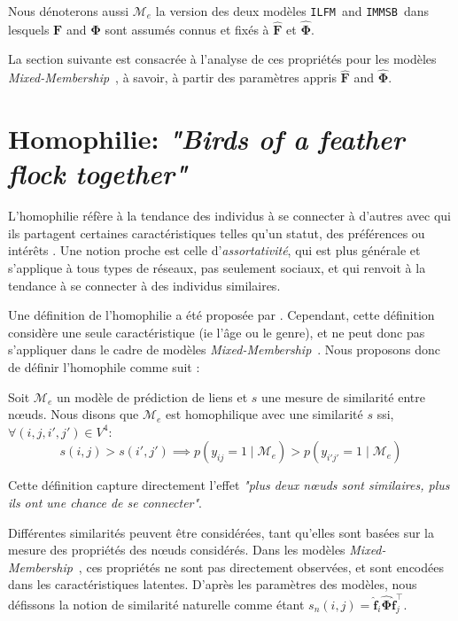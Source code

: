 \documentclass[french]{hermes-journal}
\newcommand{\ilfm}{\texttt{ILFM}}
\newcommand{\immsb}{\texttt{IMMSB}}
\newcommand{\mmm}{\textit{Mixed-Membership}~}
\newcommand{\pr}{p}
\newcommand{\mat}[1]{\bm{#1}}
\begin{document}
Nous dénoterons aussi $\mathcal{M}_e$ la version des deux modèles \ilfm\ and \immsb\ dans lesquels $\mat{F}$ and $\mat{\Phi}$ sont assumés connus et fixés à $\mat{\hat{F}}$ et  $\mat{\hat{\Phi}}$.

La section suivante est consacrée à l'analyse  de ces propriétés pour les modèles \mmm, à savoir, à partir des paramètres appris $\mat{\hat{F}}$ and $\mat{\hat{\Phi}}$.


\section{Homophilie: \emph{"Birds of a feather flock together"}}
\label{sec:homophily}

L'homophilie réfère à la tendance des individus à se connecter à d'autres avec qui ils partagent certaines caractéristiques telles qu'un statut, des préférences ou intérêts \cite{mcpherson2001birds,lazarsfeld1954friendship}.   Une notion proche est celle d'\emph{assortativité}, qui est plus générale et s'applique à tous types de réseaux, pas seulement sociaux, et qui renvoit à la tendance à se connecter à des individus similaires.


Une définition de l'homophilie a été proposée par \cite{la2010randomization}. Cependant, cette définition considère une seule caractéristique (ie l'âge ou le genre), et ne peut donc pas s'appliquer dans le cadre de modèles \mmm. Nous proposons donc de définir l'homophile comme suit : 
\begin{definition}[Homophilie] \label{def:homophily}
    Soit $\mathcal{M}_e$  un modèle de prédiction de liens et $s$ une mesure de similarité entre n\oe{}uds. Nous disons que $\mathcal{M}_e$ est homophilique avec une similarité $s$ ssi, $\forall (i,j,i',j') \in V^4$:
\begin{equation}
s(i,j) > s(i',j')  \implies \pr(y_{ij}=1 \mid \mathcal{M}_e) > \pr(y_{i'j'}=1  \mid \mathcal{M}_e) \nonumber
\end{equation}

\end{definition}

\noindent Cette définition capture directement l'effet \emph{"plus deux n\oe{}uds sont similaires, plus ils ont une chance de se connecter"}. 

Différentes similarités peuvent être considérées, tant qu'elles sont basées sur la mesure des propriétés des n\oe{}uds considérés.  Dans les modèles \mmm, ces propriétés ne sont pas directement observées, et sont encodées dans les caractéristiques latentes. D'après les paramètres des modèles, nous défissons la notion de similarité naturelle comme étant $s_n(i,j) = \mat{\hat{f}}_{i} \mat{\hat{\Phi}} \mat{\hat{f}}_j^\top$.
\end{document}
